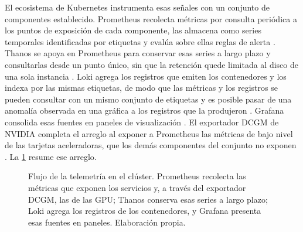El ecosistema de Kubernetes instrumenta esas señales con un conjunto de componentes establecido. Prometheus recolecta métricas por consulta periódica a los puntos de exposición de cada componente, las almacena como series temporales identificadas por etiquetas y evalúa sobre ellas reglas de alerta \citep{prometheus-overview-2026}. Thanos se apoya en Prometheus para conservar esas series a largo plazo y consultarlas desde un punto único, sin que la retención quede limitada al disco de una sola instancia \citep{thanos-quick-tutorial-2026}. Loki agrega los registros que emiten los contenedores y los indexa por las mismas etiquetas, de modo que las métricas y los registros se pueden consultar con un mismo conjunto de etiquetas y es posible pasar de una anomalía observada en una gráfica a los registros que la produjeron \citep{loki-overview-2026}. Grafana consolida esas fuentes en paneles de visualización \citep{grafana-overview-2026}. El exportador DCGM de NVIDIA completa el arreglo al exponer a Prometheus las métricas de bajo nivel de las tarjetas aceleradoras, que los demás componentes del conjunto no exponen \citep{dcgm-exporter-2026}. La \cref{fig:flujo-observabilidad} resume ese arreglo.

\begin{figure}[H]
  \centering
  \caption[Flujo de la telemetría en el clúster]{Flujo de la telemetría en el clúster. Prometheus recolecta las métricas que exponen los servicios y, a través del exportador DCGM, las de las GPU; Thanos conserva esas series a largo plazo; Loki agrega los registros de los contenedores, y Grafana presenta esas fuentes en paneles. Elaboración propia.}
  \label{fig:flujo-observabilidad}
\end{figure}

